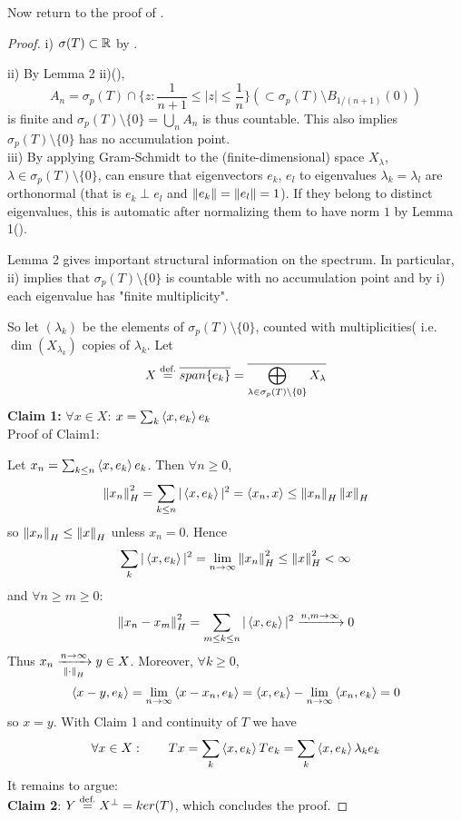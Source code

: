\documentclass{article}
\begin{document}
Now return to the proof of .  

\begin{proof}
        i) $\sigma(T) \subset \mathbb{R}$ by .  
        
	ii) By Lemma 2 ii)(),
	$$A_n=\sigma_p(T)\cap\{z:\frac{1}{n+1}\leq|z|\leq\frac{1}{n}\}(\subset \sigma_p(T)\setminus B_{1/(n+1)}(0))$$
	is finite and $\sigma_p(T)\setminus\{0\}=\bigcup_n A_n$ is thus countable. This also implies $\sigma_p(T)\setminus\{0\}$ has no accumulation point.\\
	iii) By applying Gram-Schmidt to the (finite-dimensional) space $X_\lambda$, $\lambda\in\sigma_p(T)\setminus\{0\}$, can ensure that eigenvectors $e_k$, $e_l$ to eigenvalues $\lambda_k=\lambda_l$ are orthonormal (that is $e_k \perp e_l$ and $\left\|{e_k}\right\|=\left\|{e_l}\right\|=1$). If they belong to distinct eigenvalues,  this is automatic after normalizing them to have norm $1$ by Lemma 1().\\  

 \begin{remark}
      Lemma 2 gives important structural information on the spectrum. In particular, ii) implies that $\sigma_p(T)\setminus\{0\}$ is countable with no accumulation point and by i) each eigenvalue has "finite multiplicity".
 \end{remark}  
 
	So let $(\lambda_k)$ be the elements of $\sigma_p(T)\setminus\{0\}$, counted with multiplicities( i.e. $\dim(X_{\lambda_k})$ copies of $\lambda_k$. Let
	$$
		X\stackrel{\text{def.}}{=}\overline{span\{e_k\}}=\overline{\bigoplus_{\lambda\in\sigma_p(T)\setminus\{0\}}X_\lambda}
	$$
	\textbf{Claim 1:} $\forall x\in X$: $x=\sum_k \left<{x},{e_k}\right>e_k$\\
	Proof of Claim1:   
 
        Let $x_n=\sum_{k \leq n} \left<{x},{e_k}\right>e_k$.
	Then $\forall n\geq0$,
	$$
	\left\|{x_n}\right\|_H^2=\sum_{k\leq n}|\left<{x},{e_k}\right>|^2=\left<{x_n},{x}\right>\leq\left\|{x_n}\right\|_H\left\|{x}\right\|_H$$
	so $\left\|{x_n}\right\|_H\leq\left\|{x}\right\|_H$ unless $x_n=0$. Hence
	$$\sum_{k}|\left<{x},{e_k}\right>|^2=\lim_{n\to\infty}\left\|{x_n}\right\|_H^2\leq\left\|{x}\right\|_H^2<\infty$$
	and $\forall n\geq m\geq0$:
	$$\left\|{x_n-x_m}\right\|^2_H=\sum_{m\leq k\leq n}|\left<{x},{e_k}\right>|^2\xrightarrow{n,m\to\infty}0$$
	Thus $x_n\xrightarrow[\left\|{\cdot}\right\|_H]{n\to\infty}y\in X$. Moreover, $\forall k\geq 0$,
	$$\left<{x-y},{e_k}\right>=\lim_{n\to\infty}\left<{x-x_n},{e_k}\right>=\left<{x},{e_k}\right>-\lim_{n\to\infty}\left<{x_n},{e_k}\right>=0$$
	so $x=y$. With Claim 1 and continuity of $T$ we have
	$$\forall x\in X: \qquad Tx=\sum_k \left<{x},{e_k}\right>Te_k=\sum_k \left<{x},{e_k}\right>\lambda_ke_k$$
	It remains to argue:\\
	{\bf Claim 2}: $Y\stackrel{\text{def.}}{=} X^\perp=ker(T)$, which concludes the proof.  
 

\end{proof}
\end{document}
